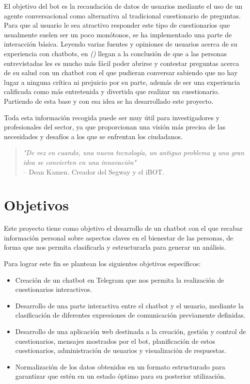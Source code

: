 El objetivo del bot es la recaudación de datos de usuarios mediante el uso de un agente conversacional como alternativa al tradicional cuestionario de preguntas. Para que al usuario le sea atractivo responder este tipo de cuestionarios que usualmente suelen ser un poco monótonos, se ha implementado una parte de interacción básica. Leyendo varias fuentes y opiniones de usuarios acerca de su experiencia con chatbots, 
 en \textit{(\cite{wellbeingchabot})} llegan a la conclusión de que a las personas entrevistadas les es mucho más fácil poder abrirse y contestar preguntas acerca de su salud con un chatbot con el que pudieran conversar sabiendo que no hay lugar a ninguna crítica ni prejuicio por su parte, además de ser una experiencia calificada como más entretenida y divertida que realizar un cuestionario. Partiendo de esta base y con esa idea se ha desarrollado este proyecto. 


Toda esta información recogida puede ser muy útil para investigadores y profesionales del sector, ya que proporcionan una visión más precisa de las necesidades y desafíos a los que se enfrentan los ciudadanos. 


\begin{quote}
    \textit{"De vez en cuando, una nueva tecnología, un antiguo problema y una gran idea se convierten en una innovación"} \\ 
    -- Dean Kamen. Creador del Segway y el iBOT.
\end{quote}

\section{Objetivos}

Este proyecto tiene como objetivo el desarrollo de un chatbot con el que recabar información personal sobre aspectos claves en el bienestar de las personas, de forma que nos permita clasificarla y estructurarla para generar un análisis. 

Para lograr este fin se plantean los siguientes objetivos específicos:

\begin{itemize}
    \item Creación de un chatbot en Telegram que nos permita la realización de cuestionarios interactivos.
    \item Desarrollo de una parte interactiva entre el chatbot y el usuario, mediante la clasificación de diferentes expresiones de comunicación previamente definidas.
    \item Desarrollo de una aplicación web destinada a la creación, gestión y control de cuestionarios, mensajes mostrados por el bot, planificación de estos cuestionarios, administración de usuarios y visualización de respuestas.
    \item Normalización de los datos obtenidos en un formato estructurado para garantizar que estén en un estado óptimo para su posterior utilización.
\end{itemize}

